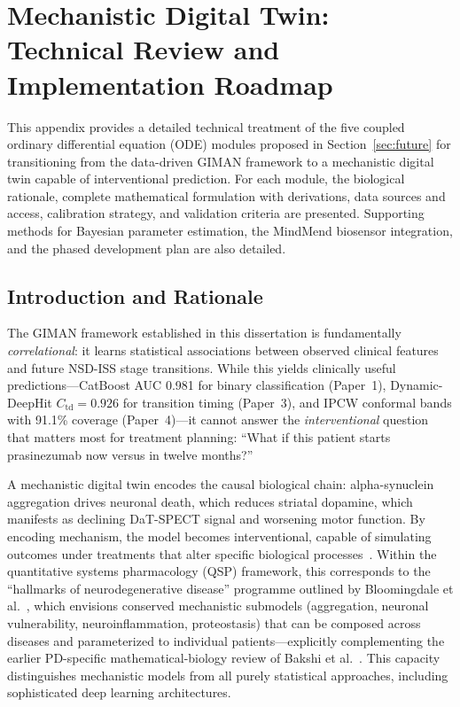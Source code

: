 
\chapter{Mechanistic Digital Twin: Technical Review and Implementation Roadmap}
\label{app:mechtwin}

This appendix provides a detailed technical treatment of the five coupled ordinary differential equation (ODE) modules proposed in Section~\ref{sec:future} for transitioning from the data-driven GIMAN framework to a mechanistic digital twin capable of interventional prediction. For each module, the biological rationale, complete mathematical formulation with derivations, data sources and access, calibration strategy, and validation criteria are presented. Supporting methods for Bayesian parameter estimation, the MindMend biosensor integration, and the phased development plan are also detailed.

\section{Introduction and Rationale}
\label{sec:mech-intro}

The GIMAN framework established in this dissertation is fundamentally \textit{correlational}: it learns statistical associations between observed clinical features and future NSD-ISS stage transitions. While this yields clinically useful predictions---CatBoost AUC 0.981 for binary classification (Paper~1), Dynamic-DeepHit $C_\text{td} = 0.926$ for transition timing (Paper~3), and IPCW conformal bands with 91.1\% coverage (Paper~4)---it cannot answer the \textit{interventional} question that matters most for treatment planning: ``What if this patient starts prasinezumab now versus in twelve months?''

A mechanistic digital twin encodes the causal biological chain: alpha-synuclein aggregation drives neuronal death, which reduces striatal dopamine, which manifests as declining DaT-SPECT signal and worsening motor function. By encoding mechanism, the model becomes interventional, capable of simulating outcomes under treatments that alter specific biological processes~\cite{bjornsson2020,corralacero2020,laubenbacher2024}. Within the quantitative systems pharmacology (QSP) framework, this corresponds to the ``hallmarks of neurodegenerative disease'' programme outlined by Bloomingdale et al.~\cite{bloomingdale2022}, which envisions conserved mechanistic submodels (aggregation, neuronal vulnerability, neuroinflammation, proteostasis) that can be composed across diseases and parameterized to individual patients---explicitly complementing the earlier PD-specific mathematical-biology review of Bakshi et al.~\cite{bakshi2018}. This capacity distinguishes mechanistic models from all purely statistical approaches, including sophisticated deep learning architectures.

